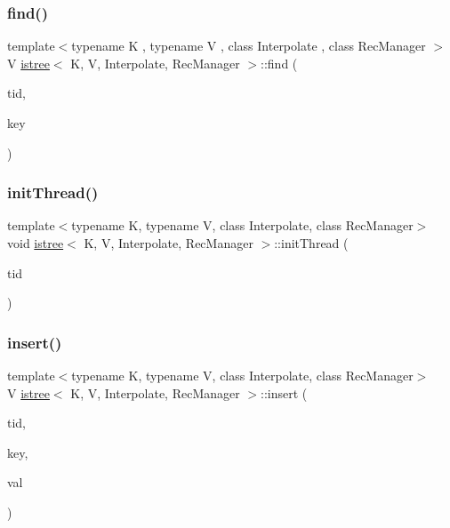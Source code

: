 \mbox{\label{classistree_aea29ccbfa17b8a91ab55683c2269bb1a}} 
\subsubsection{\texorpdfstring{find()}{find()}}
{\footnotesize\ttfamily template$<$typename K , typename V , class Interpolate , class Rec\+Manager $>$ \\
V \hyperlink{classistree}{istree}$<$ K, V, Interpolate, Rec\+Manager $>$\+::find (\begin{DoxyParamCaption}\item[{const int}]{tid,  }\item[{const K \&}]{key }\end{DoxyParamCaption})}

\mbox{\label{classistree_a314a70e06f09416a97b49c1046c8872b}} 
\subsubsection{\texorpdfstring{init\+Thread()}{initThread()}}
{\footnotesize\ttfamily template$<$typename K, typename V, class Interpolate, class Rec\+Manager$>$ \\
void \hyperlink{classistree}{istree}$<$ K, V, Interpolate, Rec\+Manager $>$\+::init\+Thread (\begin{DoxyParamCaption}\item[{const int}]{tid }\end{DoxyParamCaption})\hspace{0.3cm}{\ttfamily [inline]}}

\mbox{\label{classistree_a03da2f3c8284777c01360269f7f04031}} 
\subsubsection{\texorpdfstring{insert()}{insert()}}
{\footnotesize\ttfamily template$<$typename K, typename V, class Interpolate, class Rec\+Manager$>$ \\
V \hyperlink{classistree}{istree}$<$ K, V, Interpolate, Rec\+Manager $>$\+::insert (\begin{DoxyParamCaption}\item[{const int}]{tid,  }\item[{const K \&}]{key,  }\item[{const V \&}]{val }\end{DoxyParamCaption})\hspace{0.3cm}{\ttfamily [inline]}}

